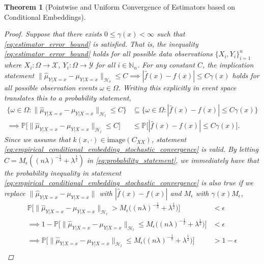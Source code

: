 \documentclass{article}
\newtheorem{theorem}{Theorem}[section]
\begin{document}
\begin{theorem}[Pointwise and Uniform Convergence of Estimators based on Conditional Embeddings]
\begin{proof}
			Suppose that there exists $0 \leq \gamma(x) < \infty$ such that \eqref{eq:estimator_error_bound} is satisfied. That is, the inequality \eqref{eq:estimator_error_bound} holds for all possible data observations $\{X_{i}, Y_{i}\}_{i = 1}^{n}$ where $X_{i} : \Omega \to \mathcal{X}$,  $Y_{i} : \Omega \to \mathcal{Y}$ for all $i \in \mathbb{N}_{n}$. For any constant $C$, the implication statement $\big\| \hat{\mu}_{Y | X = x} - \mu_{Y | X = x} \big\|_{\mathcal{H}_{\delta}} \leq C \implies | \hat{f}(x) - f(x) | \leq C \gamma(x)$ holds for all possible observation events $\omega \in \Omega$. Writing this explicitly in event space translates this to a probability statement,
			\begin{equation}
			\begin{aligned}
				\{\omega \in \Omega : \big\| \hat{\mu}_{Y | X = x} - \mu_{Y | X = x} \big\|_{\mathcal{H}_{l}} \leq C\} &\subseteq \{\omega \in \Omega : | \hat{f}(x) - f(x) | \leq C \gamma(x)\} \\
				\implies \mathbb{P}\Big[\big\| \hat{\mu}_{Y | X = x} - \mu_{Y | X = x} \big\|_{\mathcal{H}_{l}} \leq C\Big] &\leq \mathbb{P}\Big[| \hat{f}(x) - f(x) | \leq C \gamma(x) \Big].
			\label{eq:probability_statement}
			\end{aligned}
			\end{equation}
			Since we assume that $k(x, \cdot) \in \mathrm{image}(C_{XX})$, statement \eqref{eq:empirical_conditional_embedding_stochastic_convergence} is valid. By letting $C = M_{\epsilon} ((n \lambda)^{-\frac{1}{2}} + \lambda^{\frac{1}{2}})$ in \eqref{eq:probability_statement}, we immediately have that the probability inequality in statement \eqref{eq:empirical_conditional_embedding_stochastic_convergence} is also true if we replace $\| \hat{\mu}_{Y | X = x} - \mu_{Y | X = x} \|$ with $| \hat{f}(x) - f(x) |$ and $M_{\epsilon}$ with $\gamma(x) M_{\epsilon}$,
			\begin{equation}
			\begin{aligned}
			\mathbb{P}\Big[\big\| \hat{\mu}_{Y | X = x} - \mu_{Y | X = x} \big\|_{\mathcal{H}_{l}} > M_{\epsilon} \Big((n \lambda)^{-\frac{1}{2}} + \lambda^{\frac{1}{2}}\Big)\Big] &< \epsilon \\
			\implies 1 - \mathbb{P}\Big[\big\| \hat{\mu}_{Y | X = x} - \mu_{Y | X = x} \big\|_{\mathcal{H}_{l}} \leq M_{\epsilon} \Big((n \lambda)^{-\frac{1}{2}} + \lambda^{\frac{1}{2}}\Big)\Big] &< \epsilon \\
			\implies \mathbb{P}\Big[\big\| \hat{\mu}_{Y | X = x} - \mu_{Y | X = x} \big\|_{\mathcal{H}_{l}} \leq M_{\epsilon} \Big((n \lambda)^{-\frac{1}{2}} + \lambda^{\frac{1}{2}}\Big)\Big] &> 1 -  \epsilon \\

\end{aligned}
\end{equation}
\end{proof}
\end{theorem}
\end{document}
